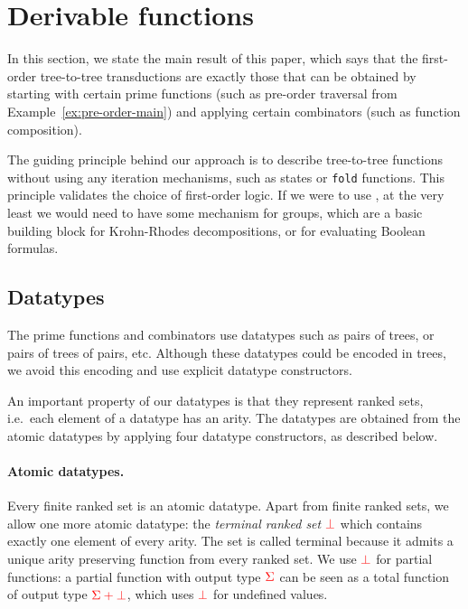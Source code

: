 \section{Derivable functions}\label{sec:derivable-functions}
In this section, we state the main result of this paper, which says that the  first-order tree-to-tree transductions are exactly those that  can be  obtained by starting with certain prime functions (such as pre-order traversal from Example~\ref{ex:pre-order-main}) and applying certain  combinators (such as function composition). 

The guiding principle behind our approach is to describe tree-to-tree functions without using  any iteration mechanisms, such as states or {\tt fold} functions. This principle validates the choice of first-order logic. If we were to use \mso, at the very least we would need to have some mechanism for groups, which are a basic building block for Krohn-Rhodes decompositions, or for evaluating Boolean formulas. 


\subsection{Datatypes}
\label{sec:datatype-constructors}
The prime functions and combinators  use  datatypes  such as pairs of trees, or pairs of trees of pairs, etc. Although these datatypes  could be encoded in trees, we avoid this encoding and use explicit datatype constructors. 

An important property of our datatypes is that they represent ranked sets, i.e.~each element of a datatype has an arity. The datatypes are obtained from the atomic datatypes by applying four datatype constructors, as described below.

\paragraph*{Atomic datatypes.} Every finite ranked set is an atomic datatype. Apart from finite ranked sets, we allow one more atomic datatype: the   \emph{terminal ranked set}  ${\color{red}{\bot}}$ which contains exactly one element of every arity.
The set is called terminal because it admits a unique arity preserving function from every  ranked set. 
We use ${\color{red}{\bot}}$ for partial functions: a partial function with output  type  ${\color{red}{\Sigma}}$ can be seen as a total function of output type ${\color{red}{{\color{red}{\Sigma}}+ {\color{red}{\bot}}}}$, which uses  ${\color{red}{\bot}}$  for  undefined values.


